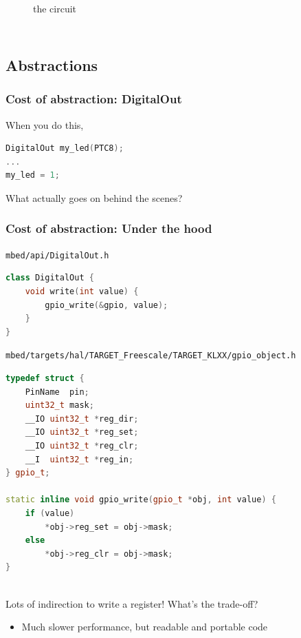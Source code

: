 \documentclass{beamer}
\begin{document}
\begin{frame}[fragile]
\begin{columns}[t]
\begin{figure}[h!]
the circuit
\end{figure}
\end{columns}
\end{frame}


\subsection{Abstractions}
\begin{frame}[fragile]
\frametitle{Cost of abstraction: DigitalOut}
When you do this,
\begin{lstlisting}[language=C++,basicstyle=\ttfamily\tiny]
DigitalOut my_led(PTC8);
...
my_led = 1;
\end{lstlisting}
What actually goes on behind the scenes?
\end{frame}


\begin{frame}[fragile]
\frametitle{Cost of abstraction: Under the hood}
{\scriptsize \texttt{mbed/api/DigitalOut.h}}
\begin{lstlisting}[language=C++,basicstyle=\ttfamily\tiny]
class DigitalOut {
    void write(int value) {
        gpio_write(&gpio, value);
    }
}
\end{lstlisting}
{\scriptsize \texttt{mbed/targets/hal/TARGET\_Freescale/TARGET\_KLXX/gpio\_object.h}}
\begin{lstlisting}[language=C++,basicstyle=\ttfamily\tiny]
typedef struct {
    PinName  pin;
    uint32_t mask;
    __IO uint32_t *reg_dir;
    __IO uint32_t *reg_set;
    __IO uint32_t *reg_clr;
    __I  uint32_t *reg_in;
} gpio_t;

static inline void gpio_write(gpio_t *obj, int value) {
    if (value)
        *obj->reg_set = obj->mask;
    else
        *obj->reg_clr = obj->mask;
}
\end{lstlisting}
\hfill \\
Lots of indirection to write a register! What's the trade-off?
 {
\begin{itemize}
  \item Much slower performance, but readable and portable code
\end{itemize}
}
\end{frame}
\end{document}
